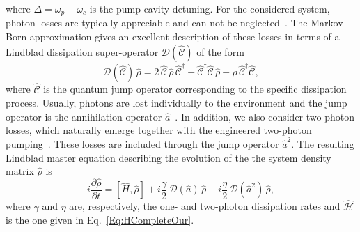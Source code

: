 where $\Delta=\omega_p-\omega_c$ is the pump-cavity detuning.
For the considered system, photon losses are typically appreciable and can not be neglected~\cite{HarocheBOOK}.
The Markov-Born approximation gives an excellent description of these losses in terms of a Lindblad dissipation super-operator $\mathcal{D}(\hat{\mathcal{C}})$ of the form ~\cite{HarocheBOOK, CarmichaelBOOK}
\begin{equation}
	\mathcal{D}(\hat{\mathcal{C}})\,\hat{\rho}=
	2\,\hat{\mathcal{C}}\,\hat{\rho}\,\hat{\mathcal{C}}^\dagger
	-\hat{\mathcal{C}}^\dagger \hat{\mathcal{C}}\,\hat{\rho}
	-\hat{\rho}\,\hat{\mathcal{C}}^\dagger\hat{\mathcal{C}},
\end{equation}
where $\hat{\mathcal{C}}$ is the quantum jump operator corresponding to the specific dissipation process.
Usually, photons are lost individually to the environment and the jump operator is the annihilation operator ${\hat{a}}$~\cite{HarocheBOOK}. In addition, we also consider two-photon losses, which naturally emerge together with the engineered two-photon pumping~\cite{LeghtasScience15}.
These losses are included through the jump operator ${\hat{a}}^2$.
The resulting Lindblad master equation describing the evolution of the the system density matrix $\hat{\rho}$ is
\begin{equation}\label{Eq:MasterEquationOur}
i \frac{\partial\hat{\rho}}{\partial t}=
\left[\hat{H},\hat{\rho}\right]
+ i \frac{\gamma}{2}\,{\mathcal{D}}({\hat{a}})\,\hat{\rho}
+ i \frac{\eta}{2}\,{\mathcal{D}}({\hat{a}}^2)\,\hat{\rho},
\end{equation}
where $\gamma$ and $\eta$ are, respectively, the one- and two-photon dissipation rates and $\hat{\mathcal{H}}$ is the one given in Eq.~\eqref{Eq:HCompleteOur}.



